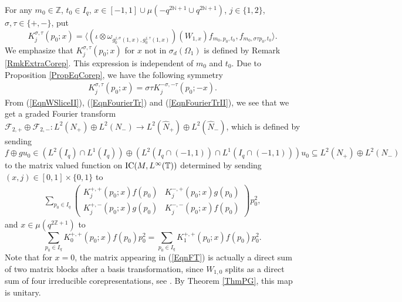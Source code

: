 \documentclass[pdftex]{sigma}
\numberwithin{equation}{section}
\theoremstyle{definition}
\begin{document}
For any $m_0 \in \mathbb{Z}$, $t_0 \in I_q$, $x \in [-1,1] \cup \mu(-q^{2\mathbb{N}+1} \cup q^{2\mathbb{N}+1})$, $j \in \{1,2\}$, $\sigma, \tau \in \{ +, - \}$, put
\[
 K_j^{\sigma, \tau}(p_0; x)  = \langle (\iota \otimes \omega_{g_0^{j,\sigma}(1,x), g_0^{j,\tau}(1,x) })(W_{1,x})f_{m_0, p_0, t_0},f_{m_0, \sigma \tau p_0, t_0} \rangle.
 \]
We emphasize that $ K_j^{\sigma, \tau}(p_0; x)$ for $x$ not in $\sigma_d(\Omega_1)$ is def\/ined by Remark \ref{RmkExtraCorep}.
This expression is independent of $m_0$ and $t_0$. Due to Proposition \ref{PropEqCorep}, we have the following symmetry
\begin{gather}\label{EqnSymmLqJ}
 K_j^{\sigma, \tau}(p_0; x) = \sigma \tau K_j^{-\sigma, -\tau}(p_0; -x).
\end{gather}
From (\ref{EqnWSliceII}), (\ref{EqnFourierTr}) and (\ref{EqnFourierTrII}), we see that we get a graded Fourier transform $\mathcal{F}_{2,+} \oplus \mathcal{F}_{2,-}: L^2(N_+) \oplus L^2(N_-) \rightarrow L^2(\hat{N}_+) \oplus L^2(\hat{N}_-)$, which is def\/ined by sending $f \oplus g u_0 \in (L^2(I_q) \cap L^1(I_q)) \oplus (L^2(I_q \cap (-1,1)) \cap L^1(I_q \cap (-1,1))) u_0 \subseteq L^2(N_+) \oplus L^2(N_-)$ to the matrix valued function on ${\rm IC}(M, L^\infty(\mathbb{T}))$ determined by sending $ (x,j)  \in  [0, 1]   \times \{0,1\} $ to
\begin{gather}\label{EqnFT}
\sum_{p_0 \in I_q}
\left(
\begin{array}{ll}
 K_j^{+, +}(p_0; x) f(p_0) &  K_j^{-, +}(p_0; x) g(p_0) \\
 K_j^{+, -}(p_0; x) g(p_0) &  K_j^{-, -}(p_0; x) f(p_0)
\end{array}
\right)
p_0^2,
\end{gather}
and $x \in \mu(q^{2 \mathbb{Z}+1})$ to
\[
\sum_{p_0 \in I_q}  K_0^{+, +}(p_0; x) f(p_0) p_0^2 = \sum_{p_0 \in I_q}  K_1^{+, +}(p_0; x) f(p_0) p_0^2.
\]
Note that for $x =0$, the matrix appearing in (\ref{EqnFT}) is actually a direct sum of two matrix blocks after a basis transformation, since $W_{1,0}$ splits as a direct sum of four irreducible corepresentations, see \cite[Proposition 10.13]{GroKoeKus}. By Theorem \ref{ThmPG}, this map is unitary.
\end{document}

